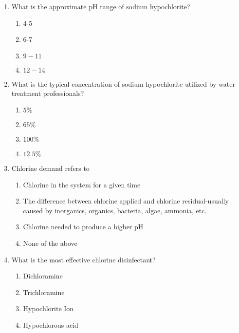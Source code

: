 \documentclass{article}
\begin{document}
\begin{enumerate}
\item  What is the approximate $\mathrm{pH}$ range of sodium hypochlorite?\\
\begin{enumerate}
\item 4-5\\
\item 6-7\\
\item $9-11$\\
\item $12-14$
\end{enumerate}

\item  What is the typical concentration of sodium hypochlorite utilized by water treatment professionals?\\
\begin{enumerate}
\item $5 \%$\\
\item $65 \%$\\
\item $100 \%$\\
\item $12.5 \%$
\end{enumerate}

\item  Chlorine demand refers to\\
\begin{enumerate}
\item Chlorine in the system for a given time\\
\item The difference between chlorine applied and chlorine residual-usually caused by inorganics, organics, bacteria, algae, ammonia, etc.\\
\item Chlorine needed to produce a higher $\mathrm{pH}$\\
\item None of the above
\end{enumerate}

\item  What is the most effective chlorine disinfectant?\\
\begin{enumerate}
\item Dichloramine\\
\item Trichloramine\\
\item Hypochlorite Ion\\
\item Hypochlorous acid
\end{enumerate} 


\end{enumerate}
\end{document}
